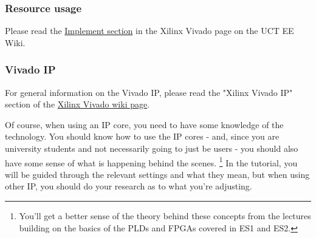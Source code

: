 \subsubsection{Resource usage}
Please read the \href{http://wiki.ee.uct.ac.za/Xilinx_Vivado#Implement}{Implement section} in the Xilinx Vivado page on the UCT EE Wiki.

\subsubsection{Vivado IP}
For general information on the Vivado IP, please read the "Xilinx Vivado IP" section of the \href{http://wiki.ee.uct.ac.za/Xilinx_Vivado#Xilinx_Vivado_IP}{Xilinx Vivado wiki page}.

Of course, when using an IP core, you need to have some knowledge of the technology. You should know how to use the IP cores - and, since you are university students and not necessarily going to just be users - you should also have some sense of what is happening behind the scenes. \footnote{You'll get a better sense of the theory behind these concepts from the lectures building on the basics of the PLDs and FPGAs covered in ES1 and ES2.} In the tutorial, you will be guided through the relevant settings and what they mean, but when using other IP, you should do your research as to what you're adjusting.



